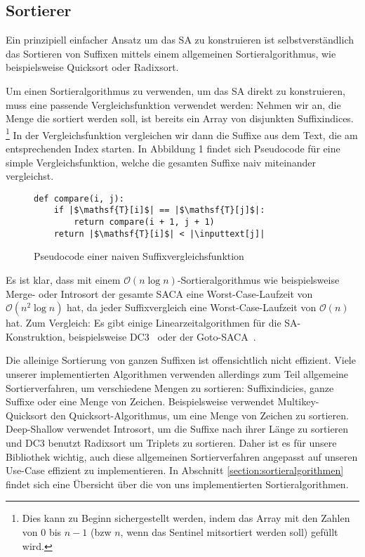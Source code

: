 \subsection{Sortierer}
Ein  prinzipiell einfacher Ansatz um das SA zu konstruieren ist selbstverständlich das Sortieren von Suffixen mittels einem allgemeinen Sortieralgorithmus, wie beispielsweise Quicksort oder Radixsort.

Um einen Sortieralgorithmus zu verwenden, um das SA direkt zu konstruieren, muss eine passende Vergleichsfunktion verwendet werden:
Nehmen wir an, die Menge die sortiert werden soll, ist bereits ein Array von disjunkten Suffixindices.
\footnote{Dies kann zu Beginn sichergestellt werden, indem das Array mit den Zahlen von 0 bis $n-1$ (bzw $n$, wenn das Sentinel mitsortiert werden soll) gefüllt wird.}
In der Vergleichsfunktion vergleichen wir dann die Suffixe aus dem Text, die am entsprechenden Index starten.
In Abbildung 1 findet sich Pseudocode für eine simple Vergleichsfunktion, welche die gesamten Suffixe naiv miteinander vergleichst.

\begin{figure}[!h]
\begin{verbatim}
def compare(i, j):
    if |$\mathsf{T}[i]$| == |$\mathsf{T}[j]$|:
        return compare(i + 1, j + 1)
    return |$\mathsf{T}[i]$| < |\inputtext[j]|
\end{verbatim}
\caption{Pseudocode einer naiven Suffixvergleichsfunktion}
\end{figure}
%
Es ist klar, dass mit einem $\mathcal O(n \log n)$-Sortieralgorithmus wie beispielsweise Merge- oder Introsort der gesamte SACA eine Worst-Case-Laufzeit von $\mathcal O(n^2 \log n)$ hat, da jeder Suffixvergleich eine Worst-Case-Laufzeit von $\mathcal O(n)$ hat.
Zum Vergleich: Es gibt einige Linearzeitalgorithmen für die SA-Konstruktion, beispielsweise DC3~\cite{saca:9} oder der Goto-SACA~\cite{saca:12}.

Die alleinige Sortierung von ganzen Suffixen ist offensichtlich nicht effizient.
Viele unserer implementierten Algorithmen verwenden allerdings zum Teil allgemeine Sortierverfahren, um verschiedene Mengen zu sortieren: Suffixindicies, ganze Suffixe oder eine Menge von Zeichen.
Beispielsweise verwendet Multikey-Quicksort den Quicksort-Algorithmus, um eine Menge von Zeichen zu sortieren.
Deep-Shallow verwendet Introsort, um die Suffixe nach ihrer Länge zu sortieren und DC3 benutzt Radixsort um Triplets zu sortieren.
Daher ist es für unsere Bibliothek wichtig, auch diese allgemeinen Sortierverfahren angepasst auf unseren Use-Case effizient zu implementieren.
In Abschnitt \ref{section:sortieralgorithmen} findet sich eine Übersicht über die von uns implementierten Sortieralgorithmen.
